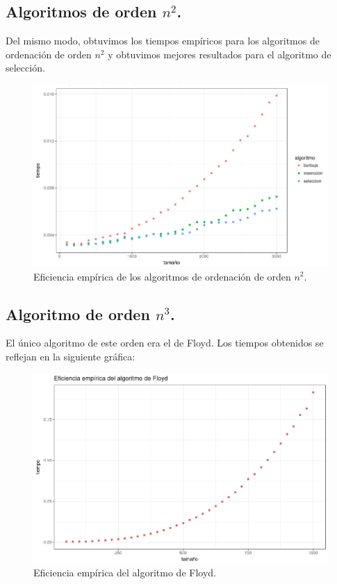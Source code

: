 \documentclass[a4paper, 11pt]{article}
\begin{document}
\subsection{Algoritmos de orden $n^2$.}

Del mismo modo, obtuvimos los tiempos empíricos para los algoritmos de ordenación de orden $n^2$ y obtuvimos mejores resultados para el algoritmo de selección.

\begin{figure}[!hbp]
	\includegraphics[width=\textwidth]{n2ord.png}
	\caption{Eficiencia empírica de los algoritmos de ordenación de orden $n^2$.\label{n2or}}
\end{figure}

\pagebreak
\subsection{Algoritmo de orden $n^3$.}
El único algoritmo de este orden era el de Floyd. Los tiempos obtenidos se reflejan en la siguiente gráfica:


\begin{figure}[!hbp]
	\includegraphics[width=\textwidth]{Floyd_empirica.png}
	\caption{Eficiencia empírica del algoritmo de Floyd.\label{floydemp}}
\end{figure}
\end{document}
